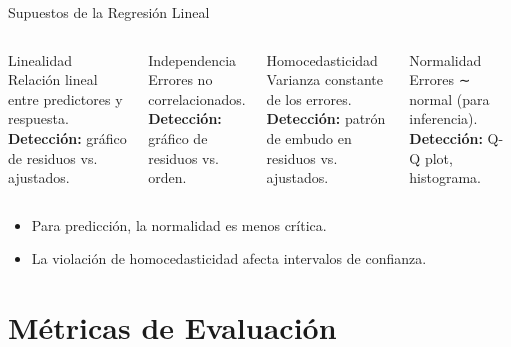 \documentclass[aspectratio=169, 10pt, xcolor=table]{beamer}
\begin{document}
\begin{frame}{Supuestos de la Regresión Lineal}
    \begin{columns}[t]
        \begin{alertblock}{Linealidad}
            Relación lineal entre predictores y respuesta. \\
            \textbf{Detección:} gráfico de residuos vs. ajustados.
        \end{alertblock}
        \begin{alertblock}{Independencia}
            Errores no correlacionados. \\
            \textbf{Detección:} gráfico de residuos vs. orden.
        \end{alertblock}
        \begin{alertblock}{Homocedasticidad}
            Varianza constante de los errores. \\
            \textbf{Detección:} patrón de embudo en residuos vs. ajustados.
        \end{alertblock}
        \begin{alertblock}{Normalidad}
            Errores ∼ normal (para inferencia). \\
            \textbf{Detección:} Q-Q plot, histograma.
        \end{alertblock}
    \end{columns}
    \vspace{0.3cm}
    \begin{itemize}
        \item Para predicción, la normalidad es menos crítica.
        \item La violación de homocedasticidad afecta intervalos de confianza.
    \end{itemize}
\end{frame}

\section{Métricas de Evaluación}
\end{document}
